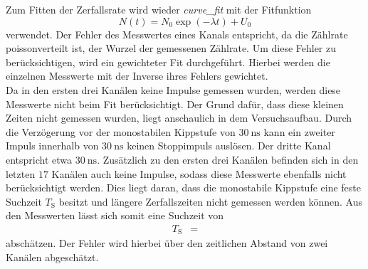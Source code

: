 Zum Fitten der Zerfallsrate wird wieder \emph{curve\_fit} mit der Fitfunktion
\begin{equation}
  N(t) = N_0 \exp{(-\lambda t)} + U_0 \label{exp}
\end{equation}
verwendet.
Der Fehler des Messwertes eines Kanals entspricht, da die Zählrate poissonverteilt ist, der Wurzel der gemessenen Zählrate. %
Um diese Fehler zu berücksichtigen, wird ein gewichteter Fit durchgeführt.
Hierbei werden die einzelnen Messwerte mit der Inverse ihres Fehlers gewichtet.\\
Da in den ersten drei Kanälen keine Impulse gemessen wurden, werden diese Messwerte nicht beim Fit berücksichtigt.
Der Grund dafür, dass diese kleinen Zeiten nicht gemessen wurden, liegt anschaulich in dem Versuchsaufbau.
Durch die Verzögerung vor der monostabilen Kippstufe von $\SI{30}{\nano\second}$ kann ein zweiter Impuls innerhalb von $\SI{30}{\nano\second}$ keinen Stoppimpuls auslösen.
Der dritte Kanal entspricht etwa $\SI{30}{\nano\second}$.
Zusätzlich zu den ersten drei Kanälen befinden sich in den letzten $\num{17}$ Kanälen auch keine Impulse, sodass diese Messwerte ebenfalls nicht berücksichtigt werden.
Dies liegt daran, dass die monostabile Kippstufe eine feste Suchzeit $T_\text{S}$ besitzt und längere Zerfallszeiten nicht gemessen werden können.
Aus den Messwerten lässt sich somit eine Suchzeit von
\begin{align*}
  T_\text{S} &= 
\end{align*}
abschätzen.
Der Fehler wird hierbei über den zeitlichen Abstand von zwei Kanälen abgeschätzt.

